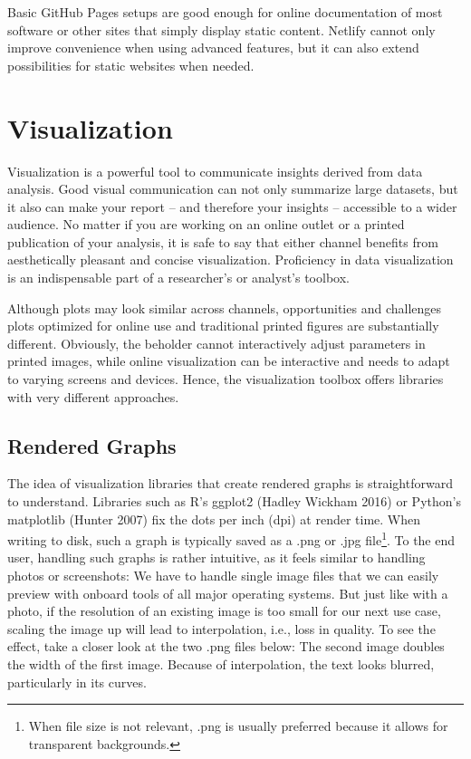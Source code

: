 \documentclass[
  12pt,
  letterpaper,
]{krantz}
\begin{document}
Basic GitHub Pages setups are good enough for online
documentation of most software or other sites that simply display static
content. Netlify cannot only improve convenience when using advanced
features, but it can also extend possibilities for static websites when
needed.

\hypertarget{visualization}{%
\section{Visualization}\label{visualization}}

Visualization is a powerful tool to communicate insights derived from
data analysis. Good visual communication can not only summarize large
datasets, but it also can make your report -- and therefore your
insights -- accessible to a wider audience. No matter if you are working
on an online outlet or a printed publication of your analysis, it is
safe to say that either channel benefits from aesthetically pleasant and
concise visualization. Proficiency in data visualization is an
indispensable part of a researcher's or analyst's toolbox.

Although plots may look similar across channels, opportunities and
challenges plots optimized for online use and traditional printed
figures are substantially different. Obviously, the beholder cannot
interactively adjust parameters in printed images, while online
visualization can be interactive and needs to adapt to varying screens
and devices. Hence, the visualization toolbox offers libraries with very
different approaches.

\hypertarget{rendered-graphs}{%
\subsection{Rendered Graphs}\label{rendered-graphs}}

The idea of visualization libraries that create rendered graphs is
straightforward to understand. Libraries such as R's ggplot2 (Hadley
Wickham 2016) or Python's matplotlib (Hunter 2007) fix the
dots per inch (dpi) at render time. When writing to disk, such a graph
is typically saved as a .png or .jpg file\footnote{When file size is not
  relevant, .png is usually preferred because it allows for transparent
  backgrounds.}. To the end user, handling such graphs is rather
intuitive, as it feels similar to handling photos or screenshots: We
have to handle single image files that we can easily preview with
onboard tools of all major operating systems. But just like with a
photo, if the resolution of an existing image is too small for our next
use case, scaling the image up will lead to interpolation, i.e., loss in
quality. To see the effect, take a closer look at the two .png files
below: The second image doubles the width of the first image. Because of
interpolation, the text looks blurred, particularly in its curves.
\end{document}
